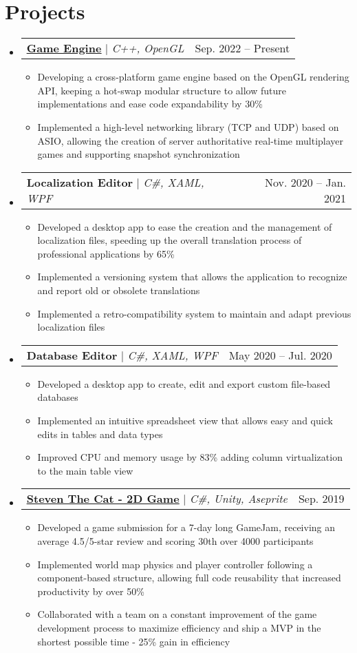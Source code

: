 \documentclass[letterpaper,11pt]{article}
\makeatletter
\newcommand{\resumeItem}[1]{
  \item\small{
    {#1 \vspace{-2pt}}
  }
}
\newcommand{\resumeProjectHeading}[2]{
    \item
    \begin{tabular*}{0.97\textwidth}{l@{\extracolsep{\fill}}r}
      \small#1 & #2 \\
    \end{tabular*}\vspace{-7pt}
}
\newcommand{\resumeSubHeadingListStart}{\begin{itemize}[leftmargin=0.15in, label={}]}
\newcommand{\resumeSubHeadingListEnd}{\end{itemize}}
\newcommand{\resumeItemListStart}{\begin{itemize}}
\newcommand{\resumeItemListEnd}{\end{itemize}\vspace{-5pt}}
\makeatother
\begin{document}
\section{Projects}
    \resumeSubHeadingListStart
      \resumeProjectHeading
          {\textbf{{\href{https://github.com/Penca53/aubengine}{\underline{Game Engine}}}} $|$ \emph{C++, OpenGL}}{Sep. 2022 -- Present}
          \resumeItemListStart
            \resumeItem{Developing a cross-platform game engine based on the OpenGL rendering API, keeping a hot-swap modular structure to allow future implementations and ease code expandability by 30\%}
            \resumeItem{Implemented a high-level networking library (TCP and UDP) based on ASIO, allowing the creation of server authoritative real-time multiplayer games and supporting snapshot synchronization}
          \resumeItemListEnd
      \resumeProjectHeading
          {\textbf{Localization Editor} $|$ \emph{C\#, XAML, WPF}}{Nov. 2020 -- Jan. 2021}
          \resumeItemListStart
            \resumeItem{Developed a desktop app to ease the creation and the management of localization files, speeding up the overall translation process of professional applications by 65\%}
            \resumeItem{Implemented a versioning system that allows the application to recognize and report old or obsolete translations}
            \resumeItem{Implemented a retro-compatibility system to maintain and adapt previous localization files}
          \resumeItemListEnd
      \resumeProjectHeading
          {\textbf{Database Editor} $|$ \emph{C\#, XAML, WPF}}{May 2020 -- Jul. 2020}
          \resumeItemListStart
            \resumeItem{Developed a desktop app to create, edit and export custom file-based databases}
            \resumeItem{Implemented an intuitive spreadsheet view that allows easy and quick edits in tables and data types}
            \resumeItem{Improved CPU and memory usage by 83\% adding column virtualization to the main table view}
          \resumeItemListEnd
      \resumeProjectHeading
          {{\textbf{{\href{https://konstantin890.itch.io/steven-the-cat}{\underline{Steven The Cat - 2D Game}}}} $|$ \emph{C\#, Unity, Aseprite}}}{Sep. 2019}
          \resumeItemListStart
            \resumeItem{Developed a game submission for a 7-day long GameJam, receiving an average 4.5/5-star review \newline
            and scoring 30th over 4000 participants}
            \resumeItem{Implemented world map physics and player controller following a component-based structure, allowing full code reusability that increased productivity by over 50\%}
            \resumeItem{Collaborated with a team on a constant improvement of the game development process to maximize efficiency and ship a MVP in the shortest possible time - 25\% gain in efficiency}
          \resumeItemListEnd
    \resumeSubHeadingListEnd
\end{document}
